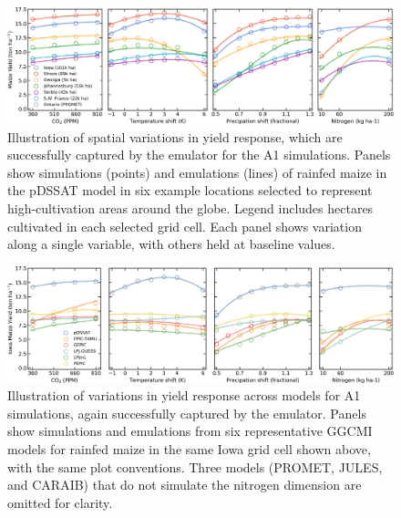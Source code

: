 \documentclass[12pt]{article}
\begin{document}
{{\begin{figure}[h!]
\centering
    \includegraphics[width=16.3cm]{regression_exampleA1.png}
    \caption{
    Illustration of spatial variations in yield response, which are successfully captured by the emulator for the A1 simulations. 
    Panels show simulations (points) and emulations (lines) of rainfed maize in the pDSSAT model in six example locations selected to represent high-cultivation areas around the globe. 
    Legend includes hectares cultivated in each selected grid cell. 
    Each panel shows variation along a single variable, with others held at baseline values. 
    }
   \label{fig:regression}
\end{figure}

\begin{figure}[h!]
\centering
    \includegraphics[width=16.3cm]{regression_exampleA1_2.png}
    \caption{
    Illustration of variations in yield response across models for A1 simulations, again successfully captured by the emulator. 
    Panels show simulations and emulations from six representative GGCMI models for rainfed maize in the same Iowa grid cell shown above, with the same plot conventions. 
    Three models (PROMET, JULES, and CARAIB) that do not simulate the nitrogen dimension are omitted for clarity. 
    }
   \label{fig:regression_2}
\end{figure}


\clearpage
}}
\end{document}
